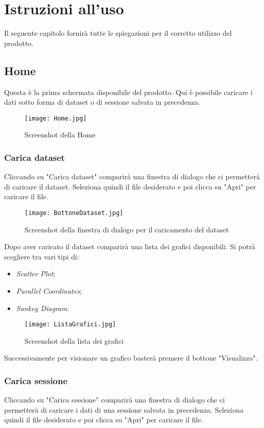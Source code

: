 \chapter{Istruzioni all'uso}
Il seguente capitolo fornirà tutte le spiegazioni per il corretto utilizzo del prodotto.

\section{Home}
Questa è la prima schermata disponibile del prodotto. Qui è possibile caricare i dati sotto forma di dataset o di sessione salvata in precedenza.

\begin{figure}[H]
    \texttt{[image: Home.jpg]}
    \caption{Screenshot della Home}
\end{figure}

\subsection{Carica dataset}
Cliccando su "Carica dataset" comparirà una finestra di dialogo che ci permetterà di caricare il dataset. Seleziona quindi il file desiderato e poi clicca su "Apri" per caricare il file.

\begin{figure}[H]
    \texttt{[image: BottoneDataset.jpg]}
    \caption{Screenshot della finestra di dialogo per il caricamento del dataset}
\end{figure}

Dopo aver caricato il dataset comparirà una lista dei grafici disponibili.
Si potrà scegliere tra vari tipi di:
\begin{itemize}
  \item \textit{Scatter Plot};
  \item \textit{Parallel Coordinates};
  \item \textit{Sankey Diagram}.
\end{itemize}

\begin{figure}[H]
    \texttt{[image: ListaGrafici.jpg]}
    \caption{Screenshot della lista dei grafici}
\end{figure}
Successivamente per visionare un grafico basterà premere il bottone "Visualizza".

\subsection{Carica sessione}
Cliccando su "Carica sessione" comparirà una finestra di dialogo che ci permetterà di caricare i dati di una sessione salvata in precedenza. Seleziona quindi il file desiderato e poi clicca su "Apri" per caricare il file.

